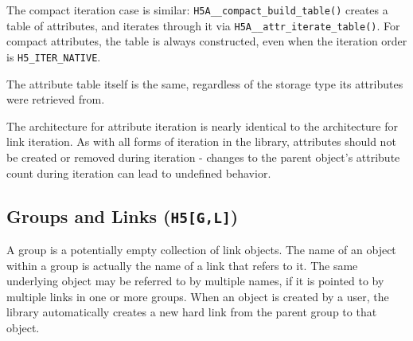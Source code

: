 \begin{itemize}
The compact iteration case is similar: \texttt{H5A\_\_compact\_build\_table()} creates a table of attributes, and iterates through it via \texttt{H5A\_\_attr\_iterate\_table()}. For compact attributes, the table is always constructed, even when the iteration order is \texttt{H5\_ITER\_NATIVE}. 

The attribute table itself is the same, regardless of the storage type its attributes were retrieved from.

The architecture for attribute iteration is nearly identical to the architecture for link iteration. As with all forms of iteration in the library, attributes should not be created or removed during iteration - changes to the parent object's attribute count during iteration can lead to undefined behavior.

\end{itemize}

\subsection{Groups and Links (\texttt{H5[G,L]})}



A group is a potentially empty collection of link objects. The name of an object within a group is actually the name of a link that refers to it. The same underlying object may be referred to by multiple names, if it is pointed to by multiple links in one or more groups. When an object is created by a user, the library automatically creates a new hard link from the parent group to that object.

